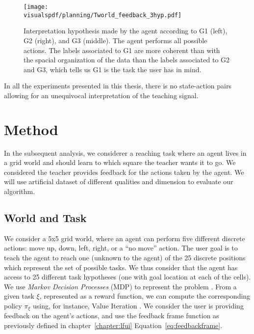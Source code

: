 \begin{figure}[H]
  \centering
  \texttt{[image: \\visualspdf/planning/Tworld\_feedback\_3hyp.pdf]}
  \caption{Interpretation hypothesis made by the agent according to G1 (left), G2 (right), and G3 (middle). The agent performs all possible actions. The labels associated to G1 are more coherent than with the spacial organization of the data than the labels associated to G2 and G3, which tells us G1 is the task the user has in mind.}
  \label{fig:planning3hyp}
\end{figure}

In all the experiments presented in this thesis, there is no state-action pairs allowing for an unequivocal interpretation of the teaching signal.

\section{Method}
\label{chapter:planning:method}

In the subsequent analysis, we considerer a reaching task where an agent lives in a grid world and should learn to which square the teacher wants it to go. We considered the teacher provides feedback for the actions taken by the agent. We will use artificial dataset of different qualities and dimension to evaluate our algorithm.


\subsection{World and Task}

We consider a 5x5 grid world, where an agent can perform five different discrete actions: move up, down, left, right, or a ``no move'' action. The user goal is to teach the agent to reach one (unknown to the agent) of the 25 discrete positions which represent the set of possible tasks. We thus consider that the agent has access to 25 different task hypotheses (one with goal location at each of the cells). We use \textit{Markov Decision Processes} (MDP) to represent the problem \cite{sutton1998reinforcement}. From a given task $\xi$, represented as a reward function, we can compute the corresponding policy $\pi_{\xi}$ using, for instance, Value Iteration \cite{sutton1998reinforcement}. We consider the user is providing feedback on the agent's actions, and use the feedback frame function as previously defined in chapter~\ref{chapter:lfui} Equation~\ref{eq:feedbackframe}.


